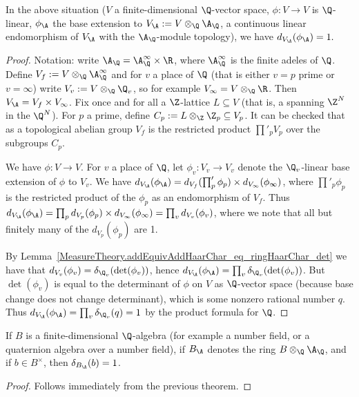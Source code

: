   \begin{theorem}
    \label{addHaarScalarFactor_eq_one}
    In the above situation ($V$ a finite-dimensional $\Q$-vector space, $\phi:V\to V$ is $\Q$-linear,
    $\phi_{\A}$ the base extension to $V_{\A}:=V\otimes_{\Q}{\A_{\Q}}$, a continuous linear
    endomorphism of $V_{\A}$ with the $\A_{\Q}$-module topology), we have $d_{V_{\A}}(\phi_{\A})=1.$
  \end{theorem}
  \begin{proof}
    Notation: write $\A_{\Q}=\A_{\Q}^\infty\times\R$, where $\A_{\Q}^\infty$ is the finite adeles of $\Q$.
    Define $V_f:= V\otimes_{\Q}\A_{\Q}^\infty$ and for $v$ a place of $\Q$ (that is either $v=p$ prime
    or $v=\infty$) write $V_v:=V\otimes_{\Q}\Q_v$, so for example $V_\infty=V\otimes_{\Q}\R$.
    Then $V_{\A}=V_f\times V_\infty$. Fix once and for all a $\Z$-lattice $L\subseteq V$
    (that is, a spanning $\Z^N$ in the $\Q^N$).
    For $p$ a prime, define $C_p:=L\otimes_{\Z}\Z_p\subseteq V_p$. It can be checked that
    as a topological abelian group $V_f$ is the restricted product $\prod'_p V_p$ over the
    subgroups $C_p$.

    We have $\phi:V\to V$. For $v$ a place of $\Q$, let $\phi_v:V_v\to V_v$ denote the $\Q_v$-linear
    base extension of $\phi$ to $V_v$. We have $d_{V_{\A}}(\phi_{\A})=d_{V_f}(\prod'_p \phi_p)\times d_{V_\infty}(\phi_\infty)$,
    where $\prod'_p \phi_p$ is the restricted product of the $\phi_p$ as an endomorphism of $V_f$.
    Thus $d_{V_{\A}}(\phi_{\A})=\prod_p d_{V_p}(\phi_p)\times d_{V_\infty}(\phi_\infty)=\prod_v d_{V_v}(\phi_v)$, where
    we note that all but finitely many of the $d_{V_p}(\phi_p)$ are 1.

    By Lemma~\ref{MeasureTheory.addEquivAddHaarChar_eq_ringHaarChar_det} we have that
    $d_{V_v}(\phi_v)=\delta_{\Q_v}(\det(\phi_v))$, hence $d_{V_{\A}}(\phi_{\A})=\prod_v\delta_{\Q_v}(\det(\phi_v))$.
    But $\det(\phi_v)$ is equal to the determinant of $\phi$ on $V$ as $\Q$-vector space (because
    base change does not change determinant),
    which is some nonzero rational number $q$. Thus $d_{V_{\A}}(\phi_{\A})=\prod_v\delta_{\Q_v}(q)=1$
    by the product formula for $\Q$.
  \end{proof}

  \begin{corollary}
    \label{NumberField.AdeleRing.units_mem_ringHaarCharacter_ker}
    If $B$ is a finite-dimensional $\Q$-algebra (for example a number field, or a quaternion algebra over a number field),
    if $B_{\A}$ denotes the ring $B\otimes_{\Q}\A_{\Q}$, and if $b\in B^\times$,
    then $\delta_{B_{\A}}(b)=1$.
  \end{corollary}
  \begin{proof}
    Follows immediately from the previous theorem.
  \end{proof}


